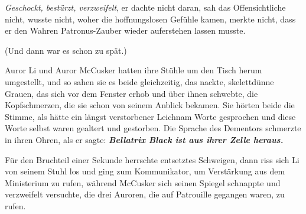 \emph{Geschockt, bestürzt, verzweifelt}, er dachte nicht daran, sah das
Offensichtliche nicht, wusste nicht, woher die hoffnungslosen Gefühle kamen,
merkte nicht, dass er den Wahren Patronus-Zauber wieder auferstehen lassen
musste.

(Und dann war es schon zu spät.)

Auror Li und Auror McCusker hatten ihre Stühle um den Tisch herum umgestellt,
und so sahen sie es beide gleichzeitig, das nackte, skelettdünne Grauen, das
sich vor dem Fenster erhob und über ihnen schwebte, die Kopfschmerzen, die sie
schon von seinem Anblick bekamen. Sie hörten beide die Stimme, als hätte ein
längst verstorbener Leichnam Worte gesprochen und diese Worte selbst waren
gealtert und gestorben. Die Sprache des Dementors schmerzte in ihren Ohren, als
er sagte:  \textbf{
}\textbf{\emph{\glqq{}Bellatrix Black ist aus ihrer Zelle heraus.\grqq{}} }

Für den Bruchteil einer Sekunde herrschte entsetztes Schweigen, dann riss sich
Li von seinem Stuhl los und ging zum Kommunikator, um Verstärkung aus dem
Ministerium zu rufen, während McCusker sich seinen Spiegel schnappte und
verzweifelt versuchte, die drei Auroren, die auf Patrouille gegangen waren, zu
rufen.

